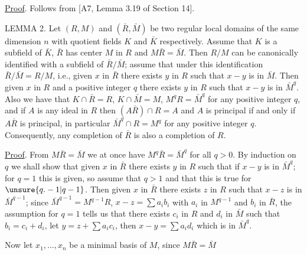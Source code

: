 
\uline{Proof}. Follows from [A7, Lemma 3.19 of Section 14].

LEMMA 2. Let $(R,M)$ and $(\bar R,\bar M)$ be two regular local domains of the same dimension $n$ with quotient fields $K$ and $\bar K$ respectively. Assume that $K$ is a subfield of $\bar K$, $\bar R$ has center $M$ in $R$ and $M\bar R=\bar M$. Then $R/M$ can be canonically identified with a subfield of $\bar R/\bar M$; assume that under this identification $\bar R/\bar M=R/M$, i.e., given $x$ in $\bar R$ there exists $y$ in $R$ such that $x-y$ is in $\bar M$. Then given $x$ in $R$ and a positive integer $q$ there exists $y$ in $R$ such that $x-y$ is in $\bar M^q$. Also we have that $K\cap\bar R=R$, $K\cap\bar M=M$, $M^qR=\bar M^q$ for any positive integer $q$, and if $A$ is any ideal in $R$ then $(A\bar R)\cap R=A$ and $A$ is principal if and only if $A\bar R$ is principal, in particular $\bar M^q\cap R=M^q$ for any positive integer $q$. Consequently, any completion of $\bar R$ is also a completion of $R$.

\uline{Proof}. From $M\bar R=\bar M$ we at once have $M^q\bar R=\bar M^q$ for all $q>0$. By induction on $q$ we shall show that given $x$ in $\bar R$ there exists $y$ in $R$ such that if $x-y$ is in $\bar M^q$; for $q=1$ this is given, so assume that $q>1$ and that this is true for $\unsure{q.-1|q-1}$. Then given $x$ in $\bar R$ there exists $z$ in $R$ such that $x-z$ is in $\bar M^{q-1}$; since $\bar M^{q-1}=M^{q-1}R$, $x-z=\sum a_ib_i$ with $a_i$ in $M^{q-1}$ and $b_i$ in $\bar R$, the assumption for $q=1$ tells us that there exists $c_i$ in $R$ and $d_i$ in $\bar M$ such that $b_i=c_i+d_i$, let $y=z+\sum a_ic_i$, then $x-y=\sum a_id_i$ which is in $\bar M^q$.

Now let $x_1,\ldots,x_n$ be a minimal basis of $M$, since $M\bar R=\bar M$
